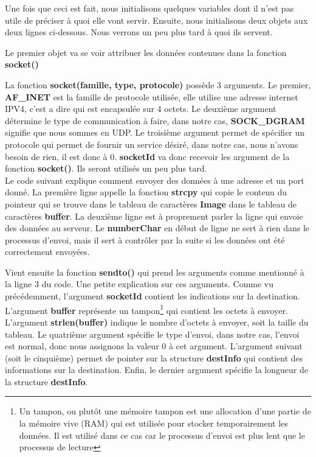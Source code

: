 \documentclass[a4paper,11pt]{report}
\begin{document}
{Une fois que ceci est fait, nous initialisons quelques variables dont il n'est pas utile de préciser à quoi elle vont servir. Ensuite, nous initialisons deux objets aux deux lignes ci-dessous. Nous verrons un peu plus tard à quoi ils servent. 

Le premier objet va se voir attribuer les données contenues dans la fonction \textbf{socket()}

La fonction \textbf{socket(famille, type, protocole)} possède 3 arguments. Le premier, \textbf{AF\_INET} est la famille de protocole utilisée, elle utilise une adresse internet IPV4, c'est a dire qui est encapsulée sur 4 octets. Le deuxième argument détermine le type de communication à faire, dans notre cas, \textbf{SOCK\_DGRAM} signifie que nous sommes en UDP. Le troisième argument permet de spécifier un protocole qui permet de fournir un service désiré, dans notre cas, nous n'avons besoin de rien, il est donc à $0$. \textbf{socketId} va donc recevoir les argument de la fonction \textbf{socket()}. Ils seront utilisés un peu plus tard.\\

Le code suivant explique comment envoyer des données à une adresse et un port donné. La première ligne appelle la fonction \textbf{strcpy} qui copie le contenu du pointeur qui se trouve dans le tableau de caractères \textbf{Image} dans le tableau de caractères \textbf{buffer}. La deuxième ligne est à proprement parler la ligne qui envoie des données au serveur. Le \textbf{numberChar} en début de ligne ne sert à rien dans le processus d'envoi, mais il sert à contrôler par la suite si les données ont été correctement envoyées. 



Vient ensuite la fonction \textbf{sendto()} qui prend les arguments comme mentionné à la ligne 3 du code. Une petite explication sur ces arguments. Comme vu précédemment, l'argument \textbf{socketId} contient les indications sur la destination. L'argument \textbf{buffer} représente un tampon\footnote{Un tampon, ou plutôt une mémoire tampon est une allocation d'une partie de la mémoire vive (RAM) qui est utilisée pour stocker temporairement les données. Il est utilisé dans ce cas car le processus d'envoi est plus lent que le processus de lecture} qui contient les octets à envoyer. L'argument \textbf{strlen(buffer)} indique le nombre d'octets à envoyer, soit la taille du tableau. Le quatrième argument spécifie le type d'envoi, dans notre cas, l'envoi est normal, donc nous assignons la valeur $0$ à cet argument. L'argument suivant (soit le cinquième) permet de pointer sur la structure \textbf{destInfo} qui contient des informations sur la destination. Enfin, le dernier argument spécifie la longueur de la structure \textbf{destInfo}.

}
\end{document}
